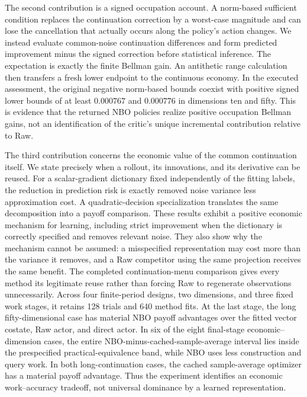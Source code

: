The second contribution is a signed occupation account. A norm-based sufficient condition replaces the continuation correction by a worst-case magnitude and can lose the cancellation that actually occurs along the policy's action changes. We instead evaluate common-noise continuation differences and form predicted improvement minus the signed correction before statistical inference. The expectation is exactly the finite Bellman gain. An antithetic range calculation then transfers a fresh lower endpoint to the continuous economy. In the executed assessment, the original negative norm-based bounds coexist with positive signed lower bounds of at least $0.000767$ and $0.000776$ in dimensions ten and fifty. This is evidence that the returned NBO policies realize positive occupation Bellman gains, not an identification of the critic's unique incremental contribution relative to Raw.

The third contribution concerns the economic value of the common continuation itself. We state precisely when a rollout, its innovations, and its derivative can be reused. For a scalar-gradient dictionary fixed independently of the fitting labels, the reduction in prediction risk is exactly removed noise variance less approximation cost. A quadratic-decision specialization translates the same decomposition into a payoff comparison. These results exhibit a positive economic mechanism for learning, including strict improvement when the dictionary is correctly specified and removes relevant noise. They also show why the mechanism cannot be assumed: a misspecified representation may cost more than the variance it removes, and a Raw competitor using the same projection receives the same benefit. The completed continuation-menu comparison gives every method its legitimate reuse rather than forcing Raw to regenerate observations unnecessarily. Across four finite-period designs, two dimensions, and three fixed work stages, it retains 128 trials and 640 method fits. At the last stage, the long fifty-dimensional case has material NBO payoff advantages over the fitted vector costate, Raw actor, and direct actor. In six of the eight final-stage economic--dimension cases, the entire NBO-minus-cached-sample-average interval lies inside the prespecified practical-equivalence band, while NBO uses less construction and query work. In both long-continuation cases, the cached sample-average optimizer has a material payoff advantage. Thus the experiment identifies an economic work--accuracy tradeoff, not universal dominance by a learned representation.


